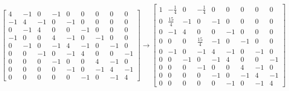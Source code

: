 \documentclass[a4paper]{article}
\begin{document}
$$
\left[\begin{array}{lllllllll}
	4 & -1 & 0 & -1 & 0 & 0 & 0 & 0 & 0 \\
	-1 & 4 & -1 & 0 & -1 & 0 & 0 & 0 & 0 \\
	0 & -1 & 4 & 0 & 0 & -1 & 0 & 0 & 0 \\
	-1 & 0 & 0 & 4 & -1 & 0 & -1 & 0 & 0 \\
	0 & -1 & 0 & -1 & 4 & -1 & 0 & -1 & 0 \\
	0 & 0 & -1 & 0 & -1 & 4 & 0 & 0 & -1 \\
	0 & 0 & 0 & -1 & 0 & 0 & 4 & -1 & 0 \\
	0 & 0 & 0 & 0 & -1 & 0 & -1 & 4 & -1 \\
	0 & 0 & 0 & 0 & 0 & -1 & 0 & -1 & 4
\end{array}\right] \rightarrow\left[\begin{array}{ccccccccc}
	1 & -\frac{1}{4} & 0 & -\frac{1}{4} & 0 & 0 & 0 & 0 & 0 \\
	0 & \frac{15}{4} & -1 & 0 & -1 & 0 & 0 & 0 & 0 \\
	0 & -1 & 4 & 0 & 0 & -1 & 0 & 0 & 0 \\
	0 & 0 & 0 & \frac{15}{4} & -1 & 0 & -1 & 0 & 0 \\
	0 & -1 & 0 & -1 & 4 & -1 & 0 & -1 & 0 \\
	0 & 0 & -1 & 0 & -1 & 4 & 0 & 0 & -1 \\
	0 & 0 & 0 & -1 & 0 & 0 & 4 & -1 & 0 \\
	0 & 0 & 0 & 0 & -1 & 0 & -1 & 4 & -1 \\
	0 & 0 & 0 & 0 & 0 & -1 & 0 & -1 & 4
\end{array}\right]
$$
\end{document}
